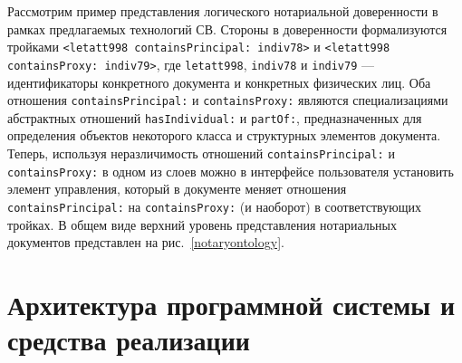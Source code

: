 \documentclass[utf8]{../IncArticle}
\newcommand{\e}[2][fcolor]{\textcolor{pcolor}{[}\textcolor{#1}{#2}\textcolor{pcolor}{]}}
\begin{document}

Рассмотрим пример представления логического нотариальной доверенности
в рамках предлагаемых технологий СВ.  Стороны в доверенности
формализуются тройками \texttt{<letatt998 containsPrincipal: indiv78>}
и \texttt{<letatt998 containsProxy: indiv79>}, где \texttt{letatt998},
\texttt{indiv78} и \texttt{indiv79} --- идентификаторы конкретного
документа и конкретных физических лиц.  Оба отношения
\texttt{containsPrincipal:} и \texttt{containsProxy:} являются
специализациями абстрактных отношений \texttt{hasIndividual:} и
\texttt{partOf:}, предназначенных для определения объектов некоторого
класса и структурных элементов документа.  Теперь, используя
неразличимость отношений \texttt{containsPrincipal:} и
\texttt{containsProxy:} в одном из слоев можно в интерфейсе
пользователя установить элемент управления, который в документе меняет
отношения \texttt{containsPrincipal:} на \texttt{containsProxy:} (и
наоборот) в соответствующих тройках.  В общем виде верхний уровень представления
нотариальных документов представлен на рис.~\ref{notaryontology}.

\section{Архитектура программной системы и средства реализации}
\end{document}
